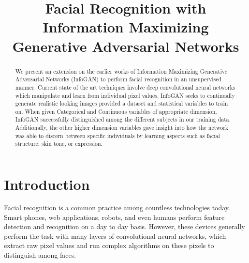 \documentclass[conference,11pt]{IEEEtran}
\begin{document}
\title{Facial Recognition with Information Maximizing Generative Adversarial Networks}

\author{
\and
{}
}

\maketitle

\begin{abstract}
We present an extension on the earlier works of Information Maximizing Generative Adversarial Networks (InfoGAN) to perform facial recognition in an unsupervised manner.  Current state of the art techniques involve deep convolutional neural networks which manipulate and learn from individual pixel values.  InfoGAN seeks to continually generate realistic looking images provided a dataset and statistical variables to train on.  When given Categorical and Continuous variables of appropriate dimension, InfoGAN successfully distinguished among the different subjects in our training data.  
Additionally, the other higher dimension variables gave insight into how the network was able to discern between specific individuals by learning aspects such as facial structure, skin tone, or expression.

\end{abstract}

\section{Introduction}
Facial recognition is a common practice among countless technologies today.  Smart phones, web applications, robots, and even humans perform feature detection and recognition on a day to day basis.  However, these devices generally perform the task with many layers of convolutional neural networks, which extract raw pixel values and run complex algorithms on these pixels to distinguish among faces.
\end{document}
